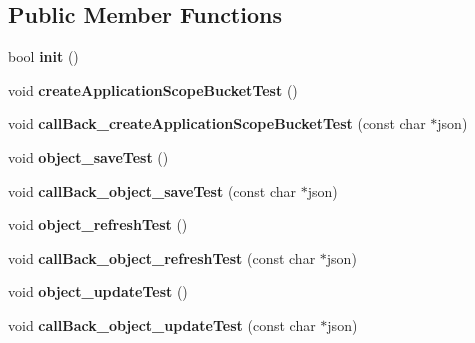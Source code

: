 \subsection*{Public Member Functions}
\begin{DoxyCompactItemize}
\item 
\hypertarget{class_c_kii_api_test_ac9326184d44029a868e18ce77ad75890}{bool {\bfseries init} ()}\label{class_c_kii_api_test_ac9326184d44029a868e18ce77ad75890}

\item 
\hypertarget{class_c_kii_api_test_adb2b39d80766474f3259987cdaad2891}{void {\bfseries create\-Application\-Scope\-Bucket\-Test} ()}\label{class_c_kii_api_test_adb2b39d80766474f3259987cdaad2891}

\item 
\hypertarget{class_c_kii_api_test_afc4622e3fe7f3054cc6e4d0cda05a35d}{void {\bfseries call\-Back\-\_\-create\-Application\-Scope\-Bucket\-Test} (const char $\ast$json)}\label{class_c_kii_api_test_afc4622e3fe7f3054cc6e4d0cda05a35d}

\item 
\hypertarget{class_c_kii_api_test_a65020b963779cefb226f66524fd6481f}{void {\bfseries object\-\_\-save\-Test} ()}\label{class_c_kii_api_test_a65020b963779cefb226f66524fd6481f}

\item 
\hypertarget{class_c_kii_api_test_aef8e5dc6b2c1ebc5523601a2bf672cfb}{void {\bfseries call\-Back\-\_\-object\-\_\-save\-Test} (const char $\ast$json)}\label{class_c_kii_api_test_aef8e5dc6b2c1ebc5523601a2bf672cfb}

\item 
\hypertarget{class_c_kii_api_test_a4ac2523bca52b9fe513e7aa27db844e0}{void {\bfseries object\-\_\-refresh\-Test} ()}\label{class_c_kii_api_test_a4ac2523bca52b9fe513e7aa27db844e0}

\item 
\hypertarget{class_c_kii_api_test_aa1b1c7d7687412af8d9167d26ed52459}{void {\bfseries call\-Back\-\_\-object\-\_\-refresh\-Test} (const char $\ast$json)}\label{class_c_kii_api_test_aa1b1c7d7687412af8d9167d26ed52459}

\item 
\hypertarget{class_c_kii_api_test_afa974f9e71dfcb5096b9ac7ac58d3576}{void {\bfseries object\-\_\-update\-Test} ()}\label{class_c_kii_api_test_afa974f9e71dfcb5096b9ac7ac58d3576}

\item 
\hypertarget{class_c_kii_api_test_a1bff468f0ca034e75ccb4d6247baed20}{void {\bfseries call\-Back\-\_\-object\-\_\-update\-Test} (const char $\ast$json)}\label{class_c_kii_api_test_a1bff468f0ca034e75ccb4d6247baed20}


\end{DoxyCompactItemize}
